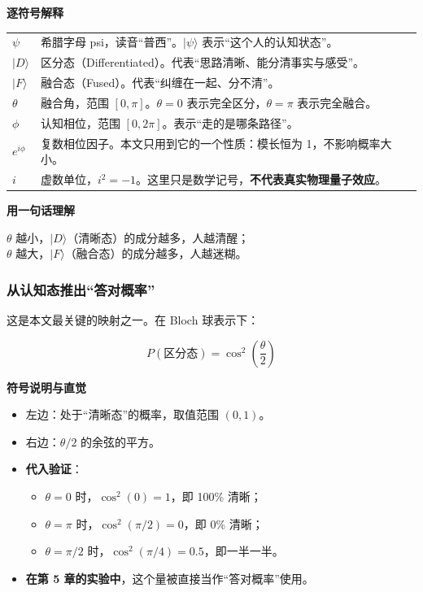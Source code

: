 \documentclass[UTF8,a4paper,11pt]{ctexart}
\newenvironment{explainbox}[1]
{\begin{center}\begin{minipage}{0.94\textwidth}\colorbox{boxbg}{\parbox{0.92\textwidth}{\textbf{#1}\par\vspace{2pt}}}}
{\end{minipage}\end{center}}
\newcommand{\warn}[1]{\textcolor{red!70!black}{\textbf{#1}}}
\begin{document}
\begin{explainbox}{逐符号解释}
\begin{longtable}{@{}p{2.6cm}p{11.2cm}@{}}
$\psi$ & 希腊字母 psi，读音“普西”。$|\psi\rangle$ 表示“这个人的认知状态”。 \\
$|D\rangle$ & 区分态（Differentiated）。代表“思路清晰、能分清事实与感受”。 \\
$|F\rangle$ & 融合态（Fused）。代表“纠缠在一起、分不清”。 \\
$\theta$ & 融合角，范围 $[0, \pi]$。$\theta=0$ 表示完全区分，$\theta=\pi$ 表示完全融合。 \\
$\phi$ & 认知相位，范围 $[0, 2\pi]$。表示“走的是哪条路径”。 \\
$e^{i\phi}$ & 复数相位因子。本文只用到它的一个性质：模长恒为 1，不影响概率大小。 \\
$i$ & 虚数单位，$i^2 = -1$。这里只是数学记号，\warn{不代表真实物理量子效应}。 \\
\end{longtable}
\end{explainbox}

\begin{explainbox}{用一句话理解}
$\theta$ 越小，$|D\rangle$（清晰态）的成分越多，人越清醒；\\
$\theta$ 越大，$|F\rangle$（融合态）的成分越多，人越迷糊。
\end{explainbox}

\subsubsection{从认知态推出“答对概率”}

这是本文最关键的映射之一。在 Bloch 球表示下：

\begin{equation}
P(\text{区分态}) = \cos^2\!\left(\frac{\theta}{2}\right)
\label{p1:eq:bloch-map}
\end{equation}

\begin{explainbox}{符号说明与直觉}
\begin{itemize}[leftmargin=1.4em,itemsep=1pt]
\item 左边：处于“清晰态”的概率，取值范围 $(0,1)$。
\item 右边：$\theta/2$ 的余弦的平方。
\item \textbf{代入验证}：
  \begin{itemize}
  \item $\theta = 0$ 时，$\cos^2(0) = 1$，即 100\% 清晰；
  \item $\theta = \pi$ 时，$\cos^2(\pi/2) = 0$，即 0\% 清晰；
  \item $\theta = \pi/2$ 时，$\cos^2(\pi/4) = 0.5$，即一半一半。
  \end{itemize}
\item \textbf{在第 5 章的实验中}，这个量被直接当作“答对概率”使用。
\end{itemize}
\end{explainbox}
\end{document}
